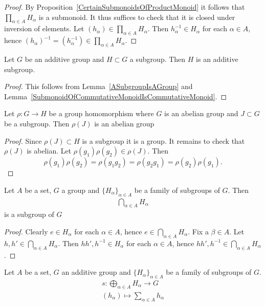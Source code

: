 \begin{proof}
    By Proposition~\ref{CertainSubmonoidsOfProductMonoid} it follows that $\prod_{\alpha\in A} H_\alpha$ is a submonoid. It thus suffices to check that it is closed under inversion of elements. Let $(h_\alpha)\in\prod_{\alpha\in A} H_\alpha$. Then $h_\alpha^{-1}\in H_\alpha$ for each $\alpha \in A$, hence $(h_\alpha)^{-1} = \left( h_\alpha^{-1} \right)\in \prod_{\alpha\in A} H_\alpha$.
\end{proof}
\begin{proposition}
    Let $G$ be an additive group and $H\subset G$ a subgroup. Then $H$ is an additive subgroup.
\end{proposition}
\begin{proof}
    This follows from Lemma~\ref{ASubgroupIsAGroup} and Lemma~\ref{SubmonoidOfCommutativeMonoidIsCommutativeMonoid}.
\end{proof}
\begin{lemma}
    Let $\rho : G\rightarrow H$ be a group homomorphism where $G$ is an abelian group and $J\subset G$ be a subgroup. Then $\rho(J)$ is an abelian group
\end{lemma}
\begin{proof}
    Since $\rho(J)\subset H$ is a subgroup it is a group. It remains to check that $\rho(J)$ is abelian. Let $\rho(g_1)\rho(g_2)\in \rho(J)$. Then 
    $$\rho(g_1)\rho(g_2)= \rho(g_1g_2)= \rho(g_2g_1) = \rho(g_2)\rho(g_1).$$
\end{proof}
\begin{proposition}\label{IntersectionsOfSubgroupIsSubgroup}
    Let $A$ be a set, $G$ a group and $\{H_\alpha\}_{\alpha\in A}$ be a family of subgroups of $G$. Then 
    \begin{gather*}
        \bigcap_{\alpha\in A} H_\alpha 
    \end{gather*}
    is a subgroup of $G$
\end{proposition}
\begin{proof}
    Clearly $e\in H_\alpha$ for each $\alpha\in A$, hence $e\in \bigcap_{\alpha\in A} H_\alpha$. Fix a $\beta\in A$. Let $h,h'\in \bigcap_{\alpha\in A} H_\alpha$. Then $hh',h^{-1}\in H_\alpha$ for each $\alpha \in A$, hence $hh',h^{-1}\in \bigcap_{\alpha\in A} H_\alpha$.
\end{proof}
\begin{proposition}\label{CanonicalGroupHomomorphismBetweenDirectSumAndSum}
    Let $A$ be a set, $G$ an additive group and $\{H_\alpha\}_{\alpha\in A}$ be a family of subgroups of $G$.
    \begin{gather*}
        s : \bigoplus_{\alpha\in A} H_\alpha \rightarrow G\\
        (h_\alpha) \mapsto \sum_{\alpha \in A} h_\alpha
    \end{gather*}
\end{proposition}

